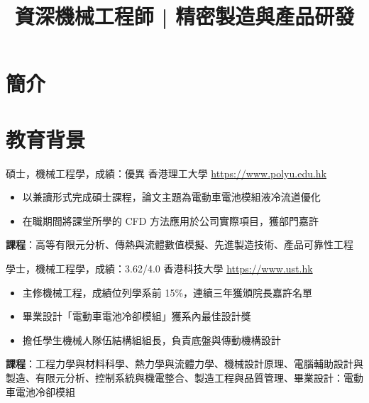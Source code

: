 \documentclass[a4paper, serif, 10pt]{moderncv}
\title{資深機械工程師 | 精密製造與產品研發}
\begin{document}
\maketitle

\section{簡介}

\section{教育背景}

        {碩士，機械工程學，成績：優異}
        {香港理工大學}
        {\url{https://www.polyu.edu.hk}}
        {}
        {\begin{itemize}
\item 以兼讀形式完成碩士課程，論文主題為電動車電池模組液冷流道優化
\item 在職期間將課堂所學的 CFD 方法應用於公司實際項目，獲部門嘉許
\end{itemize}
\textbf{課程}：高等有限元分析、傳熱與流體數值模擬、先進製造技術、產品可靠性工程}

        {學士，機械工程學，成績：3.62/4.0}
        {香港科技大學}
        {\url{https://www.ust.hk}}
        {}
        {\begin{itemize}
\item 主修機械工程，成績位列學系前 15\%，連續三年獲頒院長嘉許名單
\item 畢業設計「電動車電池冷卻模組」獲系內最佳設計獎
\item 擔任學生機械人隊伍結構組組長，負責底盤與傳動機構設計
\end{itemize}
\textbf{課程}：工程力學與材料科學、熱力學與流體力學、機械設計原理、電腦輔助設計與製造、有限元分析、控制系統與機電整合、製造工程與品質管理、畢業設計：電動車電池冷卻模組}
\end{document}
